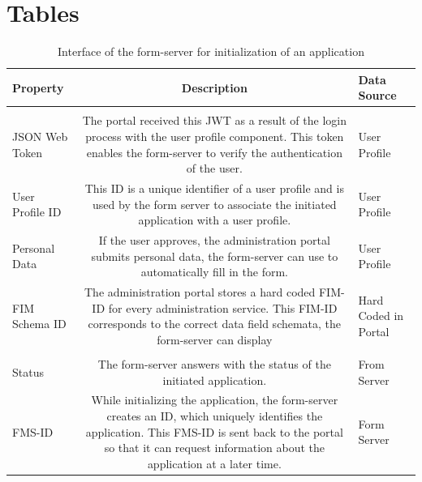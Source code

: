 \documentclass[
     12pt,         %
     a4paper,      %
     BCOR=10mm,version=first,     %
     DIV=14,version=first,        %
     ]{scrreprt}
\begin{document}
\chapter{Tables}

        \begin{table}[!h]
            \begin{tabularx}{\textwidth}{|l|C|l|}
            \hline
            Property & Description & Data Source \\
            \hline
             \\
            \hline
            
            JSON Web Token & The portal received this JWT as a result of the login process with the user profile component. This token enables the form-server to verify the authentication of the user. & User Profile \\
            
            \hline
            
            User Profile ID & This ID is a unique identifier of a user profile and is used by the form server to associate the initiated application with a user profile. & User Profile \\
            
            \hline
            
            Personal Data & If the user approves, the administration portal submits personal data, the form-server can use to automatically fill in the form. & User Profile \\
            
            \hline
            
            FIM Schema ID & The administration portal stores a hard coded FIM-ID for every administration service. This FIM-ID corresponds to the correct data field schemata, the form-server can display & Hard Coded in Portal \\
            
            \hline
             \\
            \hline
            
            Status & The form-server answers with the status of the initiated application. & From Server \\
            
            \hline
            
            FMS-ID & While initializing the application, the form-server creates an ID, which uniquely identifies the application. This FMS-ID is sent back to the portal so that it can request information about the application at a later time. & Form Server \\
            
            \hline
            \end{tabularx}
            \caption{Interface of the form-server for initialization of an application}
            \label{table:interface_form_initialization}
        \end{table}
\end{document}
